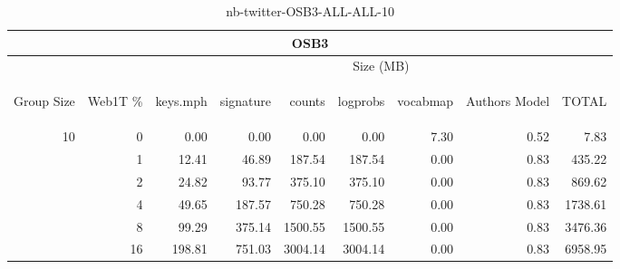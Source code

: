 \begin{center}
\begin{table}[htbp]
\begin{tabular}{ | r | r | r | r | r | r | r | r | r |}
\hline
\multicolumn{9}{|c|}{OSB3}\\
\hline
 & & \multicolumn{7}{|c|}{Size (MB)}\\ \cline{3-9}
\begin{sideways}Group Size\end{sideways} & \begin{sideways}Web1T \% \end{sideways} & \begin{sideways}keys.mph\end{sideways} & \begin{sideways}signature\end{sideways} & \begin{sideways}counts\end{sideways} & \begin{sideways}logprobs\end{sideways} & \begin{sideways}vocabmap\end{sideways} & \begin{sideways}Authors Model \end{sideways} & \begin{sideways}TOTAL\end{sideways}\\
\hline
\multirow{5}{*}{10}
 & 0 & 0.00 & 0.00 & 0.00 & 0.00 & 7.30 & 0.52 & 7.83\\ \cline{2-9}
 & 1 & 12.41 & 46.89 & 187.54 & 187.54 & 0.00 & 0.83 & 435.22\\ \cline{2-9}
 & 2 & 24.82 & 93.77 & 375.10 & 375.10 & 0.00 & 0.83 & 869.62\\ \cline{2-9}
 & 4 & 49.65 & 187.57 & 750.28 & 750.28 & 0.00 & 0.83 & 1738.61\\ \cline{2-9}
 & 8 & 99.29 & 375.14 & 1500.55 & 1500.55 & 0.00 & 0.83 & 3476.36\\ \cline{2-9}
 & 16 & 198.81 & 751.03 & 3004.14 & 3004.14 & 0.00 & 0.83 & 6958.95\\ \cline{2-9}
\hline
\end{tabular}
\caption{nb-twitter-OSB3-ALL-ALL-10}
\label{table:nb-twitter-OSB3-ALL-ALL-10}
\end{table}
\end{center}

